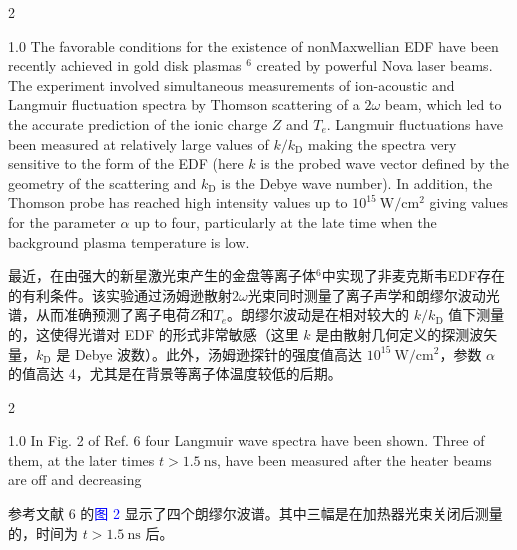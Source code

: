 \documentclass[oneside,onecolumn]{article}
\newcommand\enzhbox[2]{
  	\quad\par \begin{paracol}{2} \colseprulecolor{black} 
  			\begin{spacing}{1.0}
  				\footnotesize  #1
  			\end{spacing}
  		\switchcolumn[1] 
  		#2
  	\end{paracol} 
  }
\begin{document}
\begin{sloppypar}
{}
  
 
\enzhbox{   The favorable conditions for the existence of nonMaxwellian EDF have been recently achieved in gold disk plasmas ${ }^{6}$ created by powerful Nova laser beams. The experiment involved simultaneous measurements of ion-acoustic and Langmuir fluctuation spectra by Thomson scattering of a $2 \omega$ beam, which led to the accurate prediction of the ionic charge $Z$ and $T_{e}$. Langmuir fluctuations have been measured at relatively large values of $k / k_{\mathrm{D}}$ making the spectra very sensitive to the form of the EDF (here $k$ is the probed wave vector defined by the geometry of the scattering and $k_{\mathrm{D}}$ is the Debye wave number). In addition, the Thomson probe has reached high intensity values up to $10^{15} \mathrm{~W} / \mathrm{cm}^{2}$ giving values for the parameter $\alpha$ up to four, particularly at the late time when the background plasma temperature is low.
}{
最近，在由强大的新星激光束产生的金盘等离子体${ }^{6}$中实现了非麦克斯韦EDF存在的有利条件。该实验通过汤姆逊散射$2 \omega$光束同时测量了离子声学和朗缪尔波动光谱，从而准确预测了离子电荷$Z$和$T_{e}$。朗缪尔波动是在相对较大的 $k / k_{\mathrm{D}}$ 值下测量的，这使得光谱对 EDF 的形式非常敏感（这里 $k$ 是由散射几何定义的探测波矢量，$k_{\mathrm{D}}$ 是 Debye 波数）。此外，汤姆逊探针的强度值高达 $10^{15} \mathrm{~W} / \mathrm{cm}^{2}$，参数 $\alpha$ 的值高达 4，尤其是在背景等离子体温度较低的后期。

}
  
 
\enzhbox{   In Fig. 2 of Ref. 6 four Langmuir wave spectra have been shown. Three of them, at the later times $t>1.5 \mathrm{~ns}$, have been measured after the heater beams are off and decreasing
}{
参考文献 6 的\textcolor{blue}{图 2} 显示了四个朗缪尔波谱。其中三幅是在加热器光束关闭后测量的，时间为 $t>1.5 \mathrm{~ns}$ 后。

}
  

\end{sloppypar}
\end{document}
